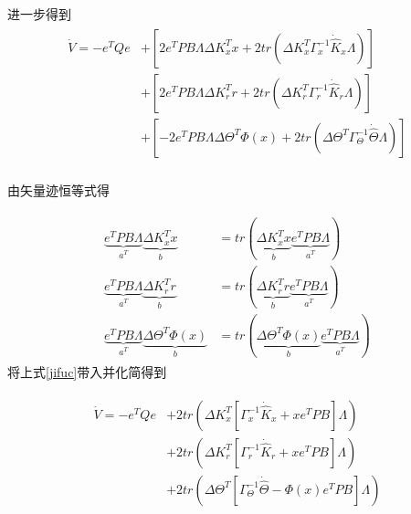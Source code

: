 进一步得到
\begin{equation}
\begin{array}{l}
\begin{split}
 \dot V =  - {e^T}Qe &+ \left[ {2{e^T}PB\Lambda \Delta K_x^Tx + 2tr\left( {\Delta K_x^T\Gamma _x^{ - 1}{{\dot {\hat K}}_x}\Lambda } \right)} \right] \\
  &+ \left[ {2{e^T}PB\Lambda \Delta K_r^Tr + 2tr\left( {\Delta K_r^T\Gamma _r^{ - 1}{{\dot {\hat K}}_r}\Lambda } \right)} \right] \\
  &+ \left[ { - 2{e^T}PB\Lambda \Delta {\Theta ^T}\Phi \left( x \right) + 2tr\left( {\Delta {\Theta ^T}\Gamma _\Theta ^{ - 1}\dot {\hat \Theta} \Lambda } \right)} \right] \\
\end{split}
 \end{array}
 \end{equation}

由矢量迹恒等式得

\begin{equation}
\label{jifuc}
\begin{array}{l}
\begin{split}
 \underbrace {{e^T}PB\Lambda }_{{a^T}}\underbrace {\Delta K_x^Tx}_b &= tr\left( {\underbrace {\Delta K_x^Tx}_b\underbrace {{e^T}PB\Lambda }_{{a^T}}} \right) \\
 \underbrace {{e^T}PB\Lambda }_{{a^T}}\underbrace {\Delta K_r^Tr}_b &= tr\left( {\underbrace {\Delta K_r^Tr}_b\underbrace {{e^T}PB\Lambda }_{{a^T}}} \right) \\
 \underbrace {{e^T}PB\Lambda }_{{a^T}}\underbrace {\Delta {\Theta ^T}\Phi \left( x \right)}_b &= tr\left( {\underbrace {\Delta {\Theta ^T}\Phi \left( x \right)}_b\underbrace {{e^T}PB\Lambda }_{{a^T}}} \right)
\end{split}
 \end{array}
\end{equation}
将上式\ref{jifuc}带入并化简得到

\begin{equation}
\begin{array}{l}
\begin{split}
 \dot V =  - {e^T}Qe &+ 2tr\left( {\Delta K_x^T\left[ {\Gamma _x^{ - 1}{{\dot {\hat K}}_x} + x{e^T}PB} \right]\Lambda } \right) \\
 &+  2tr\left( {\Delta K_r^T\left[ {\Gamma _r^{ - 1}{{\dot {\hat K}}_r} + x{e^T}PB} \right]\Lambda } \right) \\
 &+ 2tr\left( {\Delta {\Theta ^T}\left[ {\Gamma _\Theta ^{ - 1}\dot {\hat \Theta}  - \Phi \left( x \right){e^T}PB} \right]\Lambda } \right) \\
 \end{split}
 \end{array}
 \end{equation}

